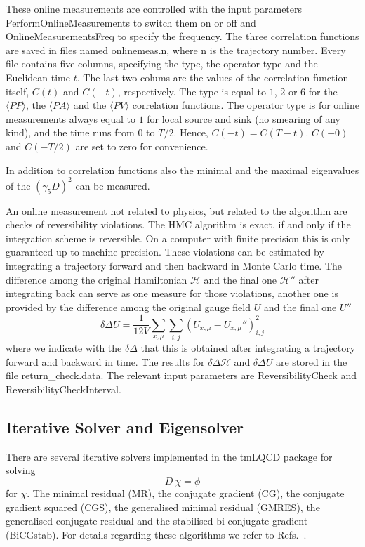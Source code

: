These online measurements are controlled with the input parameters
{\ttfamily PerformOnlineMeasurements} to switch them on or off and
{\ttfamily OnlineMeasurementsFreq} to specify the frequency. The three
correlation functions are saved in files named {\ttfamily
  onlinemeas.n}, where {\ttfamily n} is the trajectory number. Every
file contains five columns, specifying the type, the operator type and the
Euclidean time $t$. The last two colums are the values of the
correlation function itself, $C(t)$ and $C(-t)$, respectively. The
type is equal to $1$, $2$ or $6$ for the $\langle P P\rangle$, the
$\langle PA\rangle$ and the $\langle PV\rangle$ correlation
functions. The operator type is for online measurements always equal
to $1$ for local source and sink (no smearing of any kind), and the
time runs from $0$ to $T/2$. Hence, $C(-t)= C(T-t)$. $C(-0)$ and
$C(-T/2)$ are set to zero for convenience.

In addition to correlation functions also the minimal and the maximal
eigenvalues of the $(\gamma_5 D)^2$ can be measured.

An online measurement not related to physics, but related to the
algorithm are checks of reversibility violations. The HMC algorithm is
exact, if 
and only if the integration scheme is reversible. On a computer with
finite precision this is only guaranteed up to machine precision.
These violations can be estimated by integrating a trajectory
forward and then backward in Monte Carlo time. The difference among
the original Hamiltonian $\mathcal{H}$ and the final one
$\mathcal{H}''$ after integrating back can serve as one measure for
those violations, another one is provided by the difference among the
original gauge field $U$ and the final one $U''$
\[
\delta\Delta U = \frac{1}{12V}
\sum_{x,\mu}\sum_{i,j} (U_{x,\mu}-U_{x,\mu}'')_{i,j}^2
\]
where we indicate with the $\delta\Delta$ that this is obtained after
integrating a trajectory forward and backward in time. The results for
$\delta\Delta \mathcal{H}$ and $\delta\Delta U$ are
stored in the file {\ttfamily return\_check.data}. The relevant input
parameters are {\ttfamily ReversibilityCheck} and {\ttfamily
  ReversibilityCheckInterval}.

\subsection{Iterative Solver and Eigensolver}

There are several iterative solvers implemented in the tmLQCD
package for solving 
\[
D\ \chi = \phi
\]
for $\chi$. The minimal residual (MR), the conjugate gradient (CG), the
conjugate gradient squared (CGS), the generalised minimal residual
(GMRES), the generalised conjugate residual and the stabilised
bi-conjugate gradient (BiCGstab). For details regarding these
algorithms we refer to Refs.~\cite{saad:2003a,meister:1999}.

